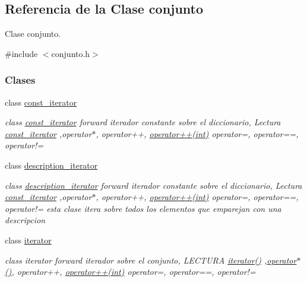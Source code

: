 \hypertarget{classconjunto}{\subsection{Referencia de la Clase conjunto}
\label{classconjunto}
}


Clase conjunto.  




{\ttfamily \#include $<$conjunto.\+h$>$}

\subsubsection*{Clases}
\begin{DoxyCompactItemize}
\item 
class \hyperlink{classconjunto_1_1const__iterator}{const\+\_\+iterator}
\begin{DoxyCompactList}\small\item\em class \hyperlink{classconjunto_1_1const__iterator}{const\+\_\+iterator} forward iterador constante sobre el diccionario, Lectura \hyperlink{classconjunto_1_1const__iterator}{const\+\_\+iterator} ,operator$\ast$, operator++, \hyperlink{classconjunto_1_1const__iterator_a2cd2caa5e80305a5cfd5e49fc4179b63}{operator++(int)} operator=, operator==, operator!= \end{DoxyCompactList}\item 
class \hyperlink{classconjunto_1_1description__iterator}{description\+\_\+iterator}
\begin{DoxyCompactList}\small\item\em class \hyperlink{classconjunto_1_1description__iterator}{description\+\_\+iterator} forward iterador constante sobre el diccionario, Lectura \hyperlink{classconjunto_1_1const__iterator}{const\+\_\+iterator} ,operator$\ast$, operator++, \hyperlink{classconjunto_1_1description__iterator_a64fc4430bdd907e7ee03992c77f419af}{operator++(int)} operator=, operator==, operator!= esta clase itera sobre todos los elementos que emparejan con una descripcion \end{DoxyCompactList}\item 
class \hyperlink{classconjunto_1_1iterator}{iterator}
\begin{DoxyCompactList}\small\item\em class iterator forward iterador sobre el conjunto, L\+E\+C\+T\+U\+R\+A \hyperlink{classconjunto_1_1iterator_ae3ade272e78f6888c39ad44a8b4b152a}{iterator()} ,\hyperlink{classconjunto_1_1iterator_a3263a8e5899cf7c89736fa6d05bc0a54}{operator$\ast$()}, operator++, \hyperlink{classconjunto_1_1iterator_af678148966f3d71b566a390e453f401d}{operator++(int)} operator=, operator==, operator!= \end{DoxyCompactList}\end{DoxyCompactItemize}
